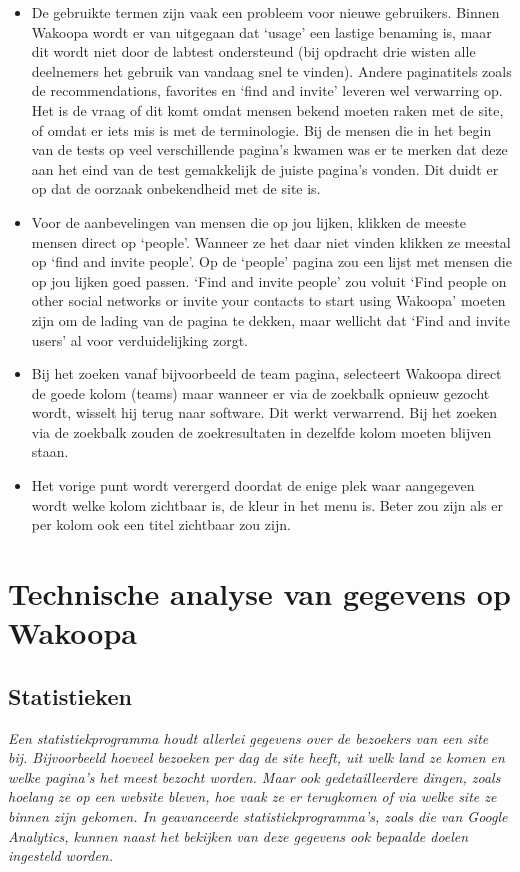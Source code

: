 \documentclass[a4paper, 10pt, pdftex]{report}
\begin{document}
      \begin{itemize}

        \item De gebruikte termen zijn vaak een probleem voor nieuwe gebruikers. Binnen Wakoopa wordt er van uitgegaan dat `usage' een lastige benaming is, maar dit wordt niet door de labtest ondersteund (bij opdracht drie wisten alle deelnemers het gebruik van vandaag snel te vinden). Andere paginatitels zoals de recommendations, favorites en `find and invite' leveren wel verwarring op. Het is de vraag of dit komt omdat mensen bekend moeten raken met de site, of omdat er iets mis is met de terminologie. Bij de mensen die in het begin van de tests op veel verschillende pagina's kwamen was er te merken dat deze aan het eind van de test gemakkelijk de juiste pagina's vonden. Dit duidt er op dat de oorzaak onbekendheid met de site is.

        \item Voor de aanbevelingen van mensen die op jou lijken, klikken de meeste mensen direct op `people'. Wanneer ze het daar niet vinden klikken ze meestal op `find and invite people'. Op de `people' pagina zou een lijst met mensen die op jou lijken goed passen. `Find and invite people' zou voluit `Find people on other social networks or invite your contacts to start using Wakoopa' moeten zijn om de lading van de pagina te dekken, maar wellicht dat `Find and invite users' al voor verduidelijking zorgt.

        \item Bij het zoeken vanaf bijvoorbeeld de team pagina, selecteert Wakoopa direct de goede kolom (teams) maar wanneer er via de zoekbalk opnieuw gezocht wordt, wisselt hij terug naar software. Dit werkt verwarrend. Bij het zoeken via de zoekbalk zouden de zoekresultaten in dezelfde kolom moeten blijven staan.

        \item Het vorige punt wordt verergerd doordat de enige plek waar aangegeven wordt welke kolom zichtbaar is, de kleur in het menu is. Beter zou zijn als er per kolom ook een titel zichtbaar zou zijn.

      \end{itemize}

  \newpage
  \chapter{Technische analyse van gegevens op Wakoopa}
    \label{datachapter}
    \newpage
    \section{Statistieken}
    \textit{Een statistiekprogramma houdt allerlei gegevens over de bezoekers van een site bij. Bijvoorbeeld hoeveel bezoeken per dag de site heeft, uit welk land ze komen en welke pagina's het meest bezocht worden. Maar ook gedetailleerdere dingen, zoals hoelang ze op een website bleven, hoe vaak ze er terugkomen of via welke site ze binnen zijn gekomen. In geavanceerde statistiekprogramma's, zoals die van Google Analytics, kunnen naast het bekijken van deze gegevens ook bepaalde doelen ingesteld worden.}
\end{document}

